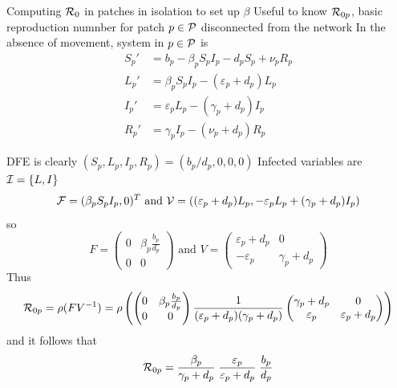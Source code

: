 \documentclass[aspectratio=169]{beamer}\usepackage[]{graphicx}\usepackage[]{xcolor}
\begin{document}
\begin{frame}{Computing $\R_0$ in patches in isolation to set up $\beta$}
Useful to know $\R_{0p}$, basic reproduction numnber for patch $p\in\P$ disconnected from the network
\vfill
In the absence of movement, system in $p\in\P$ is
\begin{subequations}
	\label{sys:pSLIRS_toy_isolated}
	\begin{align}
		S_{p}' &=b_p-\beta_pS_pI_p-d_pS_p+\nu_pR_p 
		\label{sys:pSLIRS_toy_isolated_dS} \\
		L_{p}' &=\beta_pS_pI_p-\left( \varepsilon_{p}+d_{p}\right)L_{p}
		\label{sys:pSLIRS_toy_isolated_dL} \\
		I_{p}' &=\varepsilon_pL_p-(\gamma_p+d_p)I_p
		\label{sys:pSLIRS_toy_isolated_dI} \\
		R_{p}' &=\gamma _{p}I_{p}-\left(\nu_{p}+d_{p}\right)R_{p}
		\label{sys:pSLIRS_toy_isolated_dR} 
	\end{align}
\end{subequations}
\end{frame}

\begin{frame}
DFE is clearly $(S_p,L_p,I_p,R_p)=(b_p/d_p,0,0,0)$
\vfill
Infected variables are $\I=\{L,I\}$
\vfill
\[
\F = (\beta_p S_pI_p,0)^T
\text{ and }
\V = ((\varepsilon_p+d_p)L_p,-\varepsilon_pL_p+(\gamma_p+d_p)I_p)
\]
so
\[
F=\begin{pmatrix}
0 & \beta_p\frac{b_p}{d_p} \\ 0 & 0
\end{pmatrix}
\text{ and }
V=\begin{pmatrix}
\varepsilon_p+d_p & 0 \\
-\varepsilon_p & \gamma_p+d_p
\end{pmatrix}
\]
\vfill
Thus
\[
\R_{0p} = 
\rho(FV^{-1})
=\rho\left(
\begin{pmatrix}
0 & \beta_p\frac{b_p}{d_p} \\ 0 & 0
\end{pmatrix}
\frac{1}{(\varepsilon_p+d_p)(\gamma_p+d_p)}
\begin{pmatrix}
\gamma_p+d_p & 0 \\
\varepsilon_p & \varepsilon_p+d_p
\end{pmatrix}
\right)
\]
and it follows that
\begin{equation}\label{eq:R0p}
\R_{0p}=
\frac{\beta_p}{\gamma_p+d_p}\;
\frac{\varepsilon_p}{\varepsilon_p+d_p}\;
\frac{b_p}{d_p}
\end{equation}
\end{frame}
\end{document}

